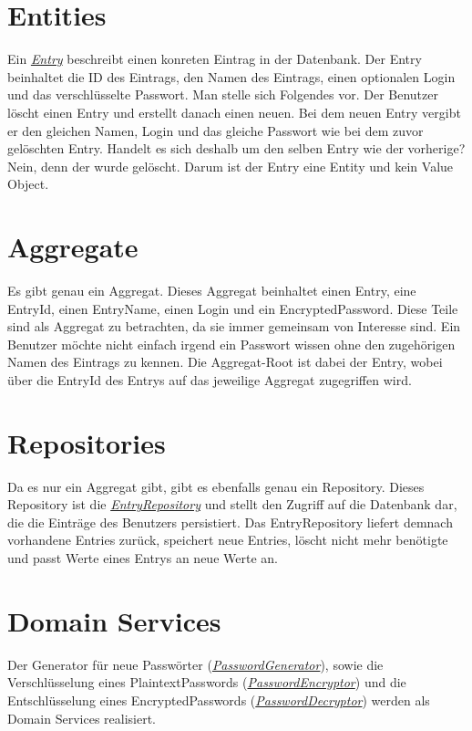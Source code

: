 \section{Entities}
Ein \href{https://github.com/moorts/Morik/blob/main/src/application/Entry.h}{\textit{Entry}} beschreibt einen konreten Eintrag in der Datenbank. Der Entry beinhaltet die ID des Eintrags, den Namen des Eintrags, einen optionalen Login und das verschlüsselte Passwort. Man stelle sich Folgendes vor. Der Benutzer löscht einen Entry und erstellt danach einen neuen. Bei dem neuen Entry vergibt er den gleichen Namen, Login und das gleiche Passwort wie bei dem zuvor gelöschten Entry. Handelt es sich deshalb um den selben Entry wie der vorherige? Nein, denn der wurde gelöscht. Darum ist der Entry eine Entity und kein Value Object.

\section{Aggregate}
Es gibt genau ein Aggregat. Dieses Aggregat beinhaltet einen Entry, eine EntryId, einen EntryName, einen Login und ein EncryptedPassword. Diese Teile sind als Aggregat zu betrachten, da sie immer gemeinsam von Interesse sind. Ein Benutzer möchte nicht einfach irgend ein Passwort wissen ohne den zugehörigen Namen des Eintrags zu kennen. Die Aggregat-Root ist dabei der Entry, wobei über die EntryId des Entrys auf das jeweilige Aggregat zugegriffen wird.

\section{Repositories}
Da es nur ein Aggregat gibt, gibt es ebenfalls genau ein Repository. Dieses Repository ist die \href{https://github.com/moorts/Morik/blob/main/src/application/EntryRepository.h}{\textit{EntryRepository}} und stellt den Zugriff auf die Datenbank dar, die die Einträge des Benutzers persistiert. Das EntryRepository liefert demnach vorhandene Entries zurück, speichert neue Entries, löscht nicht mehr benötigte und passt Werte eines Entrys an neue Werte an.

\section{Domain Services}
Der Generator für neue Passwörter (\href{https://github.com/moorts/Morik/blob/main/src/application/PasswordGenerator.h}{\textit{PasswordGenerator}}), sowie die Verschlüsselung eines PlaintextPasswords (\href{https://github.com/moorts/Morik/blob/main/src/application/PasswordEncryption.h#L11}{\textit{PasswordEncryptor}}) und die Entschlüsselung eines EncryptedPasswords (\href{https://github.com/moorts/Morik/blob/main/src/application/PasswordEncryption.h#L22}{\textit{PasswordDecryptor}}) werden als Domain Services realisiert.
